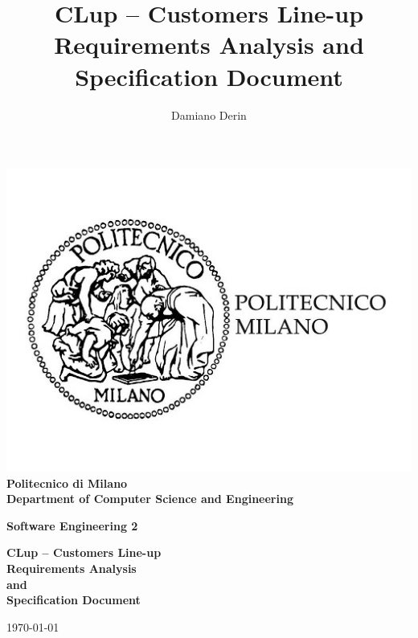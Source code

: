\title{CLup – Customers Line-up \\ Requirements Analysis and Specification Document}
\author{Damiano Derin}

    \begin{titlepage}
        \begin{center}
            \BgThispage
            \includegraphics[scale=0.3]{images/polimi_logo.jpg}\\
            {\LARGE {\bfseries Politecnico di Milano \\}}
            \vspace{.5cm}
            {\Large {\bfseries Department of Computer Science and Engineering \\}}
            \vspace{1.0cm}

            {\Large {\bfseries Software Engineering 2 \\}}
            \vspace{2.0cm}


            {\LARGE {\bfseries CLup – Customers Line-up \\
            Requirements Analysis \\ and \\ Specification Document\\}}
            \vspace{1cm}

            {\large \today \\
            }



\end{center}
\end{titlepage}
